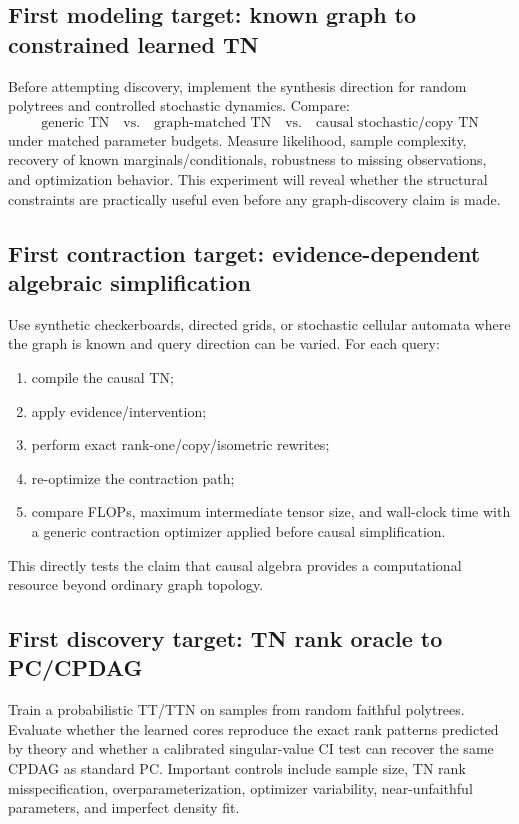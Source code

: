 \documentclass[11pt]{article}
\theoremstyle{remark}
\begin{document}
\subsection{First modeling target: known graph to constrained learned TN}

Before attempting discovery, implement the synthesis direction for random polytrees and controlled stochastic dynamics. Compare:
\begin{equation}
\text{generic TN}\quad\text{vs.}\quad\text{graph-matched TN}\quad\text{vs.}\quad\text{causal stochastic/copy TN}
\end{equation}
under matched parameter budgets. Measure likelihood, sample complexity, recovery of known marginals/conditionals, robustness to missing observations, and optimization behavior. This experiment will reveal whether the structural constraints are practically useful even before any graph-discovery claim is made.

\subsection{First contraction target: evidence-dependent algebraic simplification}

Use synthetic checkerboards, directed grids, or stochastic cellular automata where the graph is known and query direction can be varied. For each query:
\begin{enumerate}
\item compile the causal TN;
\item apply evidence/intervention;
\item perform exact rank-one/copy/isometric rewrites;
\item re-optimize the contraction path;
\item compare FLOPs, maximum intermediate tensor size, and wall-clock time with a generic contraction optimizer applied before causal simplification.
\end{enumerate}
This directly tests the claim that causal algebra provides a computational resource beyond ordinary graph topology.

\subsection{First discovery target: TN rank oracle to PC/CPDAG}

Train a probabilistic TT/TTN on samples from random faithful polytrees. Evaluate whether the learned cores reproduce the exact rank patterns predicted by theory and whether a calibrated singular-value CI test can recover the same CPDAG as standard PC. Important controls include sample size, TN rank misspecification, overparameterization, optimizer variability, near-unfaithful parameters, and imperfect density fit.
\end{document}
